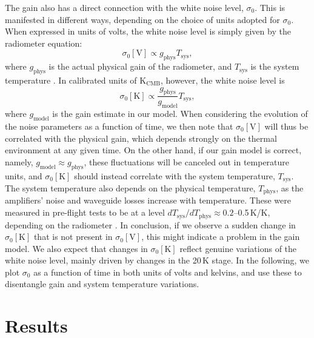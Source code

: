 \documentclass{aa}
\begin{document}
The gain also has a direct connection with the white noise level,
$\sigma_0$. This is manifested in different ways, depending on the
choice of units adopted for $\sigma_0$. When expressed in units of
volts, the white noise level is simply given by the radiometer
equation:
\begin{equation}
        \sigma_0 [\mathrm{V}] \propto g_\mathrm{phys} T_\mathrm{sys},
\end{equation}
where $g_\mathrm{phys}$ is the actual physical gain of the radiometer,
and $T_\mathrm{sys}$ is the system temperature \citep{bp01}. In
calibrated units of $\mathrm{K}_{\mathrm{CMB}}$, however, the white
noise level is
\begin{equation}
        \sigma_0 [\mathrm{K}] \propto \frac{g_\mathrm{phys} }{g_\mathrm{model}}T_\mathrm{sys},
\end{equation}
where $g_\mathrm{model}$ is the gain estimate in our model. When
considering the evolution of the noise parameters as a function of
time, we then note that $\sigma_0 [\mathrm{V}]$ will thus be correlated with
the physical gain, which depends strongly on the thermal environment
at any given time. 
On the other hand, if our gain model is correct, namely,
$g_{\mathrm{model}}\approx g_{\mathrm{phys}}$, these fluctuations
will be canceled out in temperature units, and $\sigma_0 [\mathrm{K}]$ should
instead correlate with
the system temperature, $T_\mathrm{sys}$. The system temperature also
depends on the physical temperature, $T_{\mathrm{phys}}$, as the amplifiers' noise and waveguide losses increase with temperature. These were measured in pre-flight tests to be at a level
${dT_{\mathrm{sys}} / dT_{\mathrm{phys}} } \approx 0.2$--0.5\,K/K, depending on
the radiometer \citep{terenzi2009b}.
In conclusion, if we observe a sudden change in $\sigma_0 [\mathrm{K}]$ that is not present in $\sigma_0 [\mathrm{V}]$, this might indicate a problem in the gain model. We also expect that changes in $\sigma_0 [\mathrm{K}]$ reflect genuine variations of the white noise level, mainly driven by changes in the 20\,K stage.
In the following, we plot $\sigma_0$ as a function
of time in both units of volts and kelvins, and use these to
disentangle gain and system temperature variations.

\section{Results}
\label{sec:results}
\end{document}
